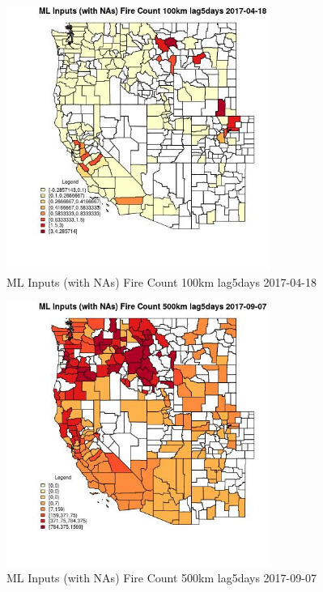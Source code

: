 \begin{figure} 
\centering  
\includegraphics[width=0.77\textwidth]{Code_Outputs/Report_ML_input_PM25_Step4_part_e_de_duplicated_aves_compiled_2019-05-20wNAs_CountyFire_Count_100km_lag5daysMean2017-04-18.jpg} 
\caption{\label{fig:Report_ML_input_PM25_Step4_part_e_de_duplicated_aves_compiled_2019-05-20wNAsCountyFire_Count_100km_lag5daysMean2017-04-18}ML Inputs (with NAs) Fire Count 100km lag5days 2017-04-18} 
\end{figure} 
 

\begin{figure} 
\centering  
\includegraphics[width=0.77\textwidth]{Code_Outputs/Report_ML_input_PM25_Step4_part_e_de_duplicated_aves_compiled_2019-05-20wNAs_CountyFire_Count_500km_lag5daysMean2017-09-07.jpg} 
\caption{\label{fig:Report_ML_input_PM25_Step4_part_e_de_duplicated_aves_compiled_2019-05-20wNAsCountyFire_Count_500km_lag5daysMean2017-09-07}ML Inputs (with NAs) Fire Count 500km lag5days 2017-09-07} 
\end{figure} 
 

